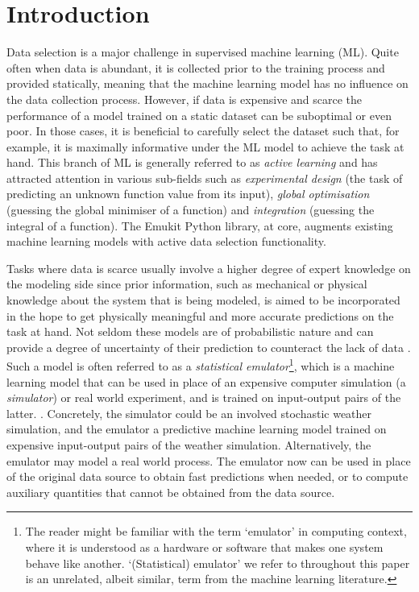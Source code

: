 \newcommand{\maren}[1]{{\color{cyan} \textbf{[Maren: #1]}}}
\newcommand{\andrei}[1]{{\color{red} \textbf{[Andrei: #1]}}}

\section{Introduction}\label{introduction}

Data selection is a major challenge in supervised machine learning (ML). Quite often when data is abundant, it is collected prior to the training process and provided statically, meaning that the machine learning model has no influence on the data collection process. However, if data is expensive and scarce the performance of a model trained on a static dataset can be suboptimal or even poor. In those cases, it is beneficial to carefully select the dataset such that, for example, it is maximally informative under the ML model to achieve the task at hand. This branch of ML is generally referred to as \emph{active learning} \cite{Settles2009} and has attracted attention in various sub-fields such as \emph{experimental design} (the task of predicting an unknown function value from its input), \emph{global optimisation} (guessing the global minimiser of a function) and \emph{integration} (guessing the integral of a function).
The Emukit Python library, at core, augments existing machine learning models with active data selection functionality.

Tasks where data is scarce usually involve a higher degree of expert knowledge on the modeling side since prior information, such as mechanical or physical knowledge about the system that is being modeled, is aimed to be incorporated in the hope to get physically meaningful and more accurate predictions on the task at hand. Not seldom these models are of probabilistic nature and can provide a degree of uncertainty of their prediction to counteract the lack of data \cite{RasmussenWilliams2006, Ho1995, MacKay1991APB, Smith1998UncertaintyAA}. Such a model is often referred to as a \emph{statistical emulator}\footnote{The reader might be familiar with the term `emulator' in computing context, where it is understood as a hardware or software that makes one system behave like another. `(Statistical) emulator' we refer to throughout this paper is an unrelated, albeit similar, term from the machine learning literature.}, which is a machine learning model that can be used in place of an expensive computer simulation (a \emph{simulator}) or real world experiment, and is trained on input-output pairs of the latter. \cite{Kennedy2000, Kennedy2001, Conti2009, Conti2010}. Concretely, the simulator could be an involved stochastic weather simulation, and the emulator a predictive machine learning model trained on expensive input-output pairs of the weather simulation. Alternatively, the emulator may model a real world process. The emulator now can be used in place of the original data source to obtain fast predictions when needed, or to compute auxiliary quantities that cannot be obtained from the data source.

